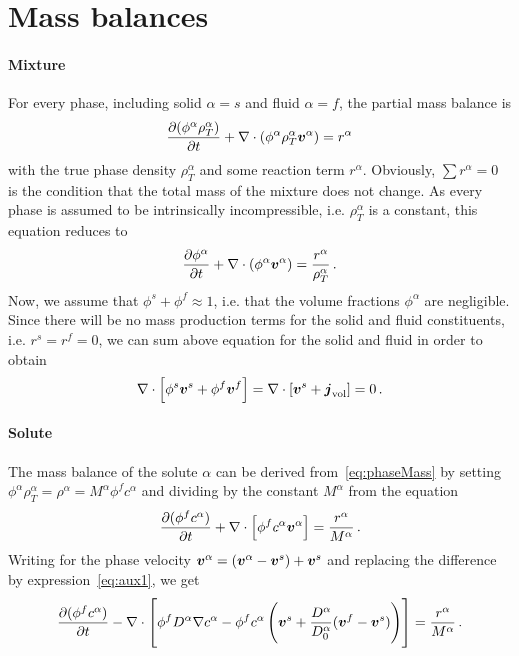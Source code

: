 \documentclass[a4paper,DIV=12,10pt]{scrartcl}
\newcommand{\V}[0]{\vek{v}}
\begin{document}
\section{Mass balances}
\label{sec:mass}

\paragraph{Mixture}
For every phase, including solid $\alpha = s$ and fluid $\alpha = f$, the
partial mass balance is
\begin{equation}
  \label{eq:phaseMass}
  \frac{\partial (\phi^\alpha \rho^\alpha_T) }{\partial t} +
  \nabla \cdot (\phi^\alpha \rho^\alpha_T \V^\alpha) = r^\alpha
\end{equation}
with the true phase density $\rho^\alpha_T$ and some reaction term $r^\alpha$.
Obviously, $\sum r^\alpha = 0$ is the condition that the total mass of the
mixture does not change.  As every phase is assumed to be intrinsically
incompressible, i.e. $\rho^\alpha_T$ is a constant, this equation reduces to
\begin{equation}
  \label{eq:phaseMass2}
  \frac{\partial \phi^\alpha}{\partial t} + \nabla \cdot 
  (\phi^\alpha \V^\alpha) = \frac{r^\alpha}{\rho_T^\alpha}\,.
\end{equation}
Now, we assume that $\phi^s + \phi^f \approx 1$, i.e. that the volume
fractions $\phi^\alpha$ are negligible. Since there will be no mass production
terms for the solid and fluid constituents, i.e. $r^s = r^f = 0$, we can sum
above equation for the solid and fluid in order to obtain
\begin{equation}
  \label{eq:mixtureMass}
  \nabla \cdot \left[ \phi^s \V^s + \phi^f \V^f  \right] = 
  \nabla \cdot \left[ \V^s + \vek{j}_{\text{vol}} \right] = 0\,.
\end{equation}

\paragraph{Solute}
The mass balance of the solute $\alpha$ can be derived
from~\eqref{eq:phaseMass}
by setting $\phi^\alpha \rho^\alpha_T = \rho^\alpha = M^\alpha \phi^f
c^\alpha$
and dividing by the constant $M^\alpha$ from the equation
\begin{equation}
  \label{eq:soluteMass1}
  \frac{\partial (\phi^f c^\alpha) }{\partial t} + \nabla \cdot \left[ \phi^f
    c^\alpha \V^\alpha \right] = \frac{r^\alpha}{M^\alpha}\,.
\end{equation}
Writing for the phase velocity $\V^\alpha = (\V^\alpha - \V^s) + \V^s$ and
replacing the difference by expression~\eqref{eq:aux1}, we get
\begin{equation}
  \label{eq:soluteMass}
  \frac{\partial( \phi^f c^\alpha )}{\partial t} - \nabla \cdot \left[
    \phi^f D^\alpha \nabla c^\alpha - \phi^f c^\alpha \left( \V^s +
      \frac{D^\alpha}{D^\alpha_0} (\V^f - \V^s) \right) \right] 
  = \frac{r^\alpha}{M^\alpha}\,.
\end{equation}
\end{document}
